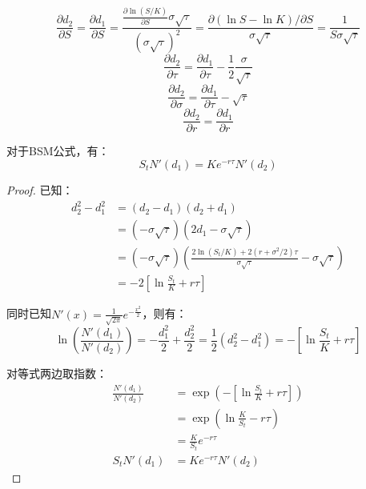 \documentclass[11pt]{article}
\begin{document}
\begin{lemma}
    \begin{equation*}
        \frac{\partial d_2}{\partial S} = \frac{\partial d_1}{\partial S} = \frac{\frac{\partial \ln(S/K)}{\partial S} \sigma \sqrt{\tau}}{(\sigma \sqrt{\tau})^2} = \frac{\partial (\ln S - \ln K)/\partial S}{\sigma\sqrt{\tau}} = \frac{1}{S\sigma\sqrt{\tau}}
    \end{equation*}
    \begin{equation*}
        \frac{\partial d_2}{\partial \tau} = \frac{\partial d_1}{\partial \tau} - \frac{1}{2}\frac{\sigma}{\sqrt{\tau}}
    \end{equation*}
    \begin{equation*}
        \frac{\partial d_2}{\partial \sigma} = \frac{\partial d_1}{\partial \tau} - \sqrt{\tau}
    \end{equation*}
    \begin{equation*}
        \frac{\partial d_2}{\partial r} = \frac{\partial d_1}{\partial r}
    \end{equation*}
\end{lemma}

\begin{lemma}
    对于BSM公式，有：
    \begin{equation*}
        S_t N'(d_1) = Ke^{-r\tau} N'(d_2)
    \end{equation*}
\end{lemma}

\begin{proof}
    已知：
    \begin{align*}
        d_2^2-d_1^2 &= (d_2-d_1)(d_2+d_1) \\
        &= (-\sigma\sqrt{\tau})(2d_1-\sigma\sqrt{\tau}) \\
        &= (-\sigma\sqrt{\tau})\left(\frac{2\ln(S_t/K) + 2(r+\sigma^2/2)\tau}{\sigma\sqrt{\tau}} -\sigma\sqrt{\tau}\right) \\
        &= -2\left[\ln\frac{S_t}{K}+r\tau\right]
    \end{align*}

    同时已知$N'(x)=\frac{1}{\sqrt{2\pi}} e^{-\frac{x^2}{2}}$，则有：
    \begin{equation*}
        \ln\left(\frac{N'(d_1)}{N'(d_2)}\right)
        = -\frac{d_1^2}{2} + \frac{d_2^2}{2}
        = \frac{1}{2} (d_2^2-d_1^2)
        = -\left[\ln\frac{S_t}{K} +r\tau\right]
    \end{equation*}

    对等式两边取指数：
    \begin{align*}
        \frac{N'(d_1)}{N'(d_2)} 
        &= \exp\left( -\left[\ln\frac{S_t}{K} +r\tau\right] \right) \\
        &= \exp \left( \ln\frac{K}{S_t}-r\tau \right) \\
        &= \frac{K}{S_t} e^{-r\tau} \\
        S_t N'(d_1) &= Ke^{-r\tau} N'(d_2)
    \end{align*}
\end{proof}
\end{document}
